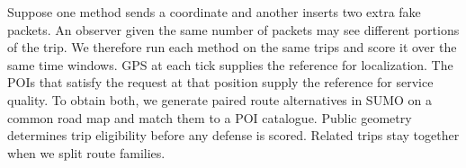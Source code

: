 Suppose one method sends a coordinate and another inserts two extra fake
packets. An observer given the same number of packets may see different
portions of the trip. We therefore run each method on the same trips and
score it over the same time windows. GPS at each tick supplies the reference
for localization. The POIs that satisfy the request at that position supply
the reference for service quality. To obtain both, we generate paired route
alternatives in SUMO on a common road map and match them to a POI catalogue.
Public geometry determines trip eligibility before any defense is scored.
Related trips stay together when we split route families.
